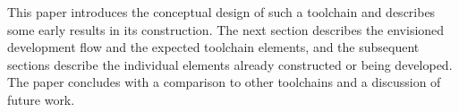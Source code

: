 This paper introduces the conceptual design of such a toolchain and describes some early results in its construction. The next section describes the envisioned development flow and the expected toolchain elements, and the subsequent sections describe the individual elements already constructed or being developed. The paper concludes with a comparison to other toolchains and a discussion of future work. 



